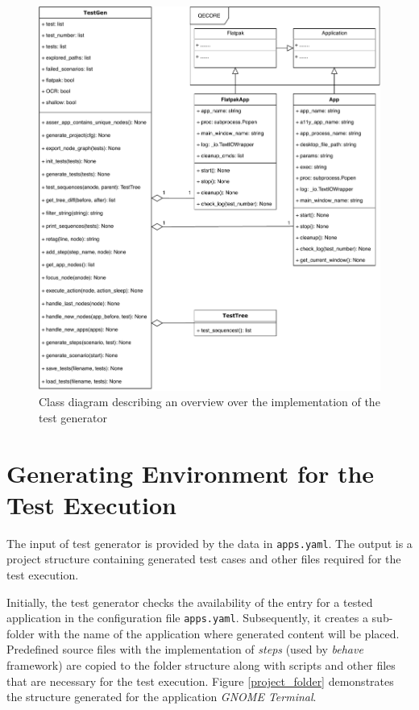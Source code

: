\begin{figure}[H]
	\centering
	\includegraphics[width=1\textwidth,clip]{obrazky-figures/TestGen_class_diagram.pdf}
	\caption{Class diagram describing an overview over the implementation of the test generator}
	\label{test_gen}
\end{figure}

\section{Generating Environment for the Test Execution}
The input of test generator is provided by the data in \texttt{apps.yaml}. The output is a project structure containing generated test cases and other files required for the test execution. 

Initially, the test generator checks the availability of the entry for a tested application in the configuration file \texttt{apps.yaml}. Subsequently, it creates a sub-folder with the name of the application where generated content will be placed. Predefined source files with the implementation of \textit{steps} (used by \textit{behave} framework) are copied to the folder structure along with scripts and other files that are necessary for the test execution. Figure \ref{project_folder} demonstrates the structure generated for the application \textit{GNOME Terminal}.

